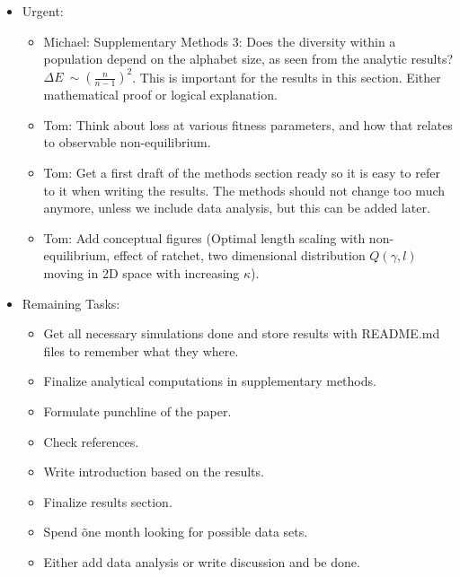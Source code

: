 \documentclass[10pt,a4paper]{article}
\begin{document}
\begin{itemize}
	\color{ForestGreen}
	\item Urgent:
	\begin{itemize}
		\item Michael: Supplementary Methods 3: Does the diversity within a population depend on the alphabet size, as seen from the analytic results? $\Delta E ~\sim \left(\frac{n}{n-1}\right)^2$. This is important for the results in this section. Either mathematical proof or logical explanation.
		\item Tom: Think about loss at various fitness parameters, and how that relates to observable non-equilibrium.
		\item Tom: Get a first draft of the methods section ready so it is easy to refer to it when writing the results. The methods should not change too much anymore, unless we include data analysis, but this can be added later.
		\item Tom: Add conceptual figures (Optimal length scaling with non-equilibrium, effect of ratchet, two dimensional distribution $Q(\gamma, l)$ moving in 2D space with increasing $\kappa$).
	\end{itemize}
	\item Remaining Tasks:
	\begin{itemize}
		\item Get all necessary simulations done and store results with README.md files to remember what they where.
		\item Finalize analytical computations in supplementary methods.
		\item Formulate punchline of the paper.
		\item Check references.
		\item Write introduction based on the results.
		\item Finalize results section.
		\item Spend \~ one month looking for possible data sets.
		\item Either add data analysis or write discussion and be done.
	\end{itemize}
\end{itemize}
\end{document}
